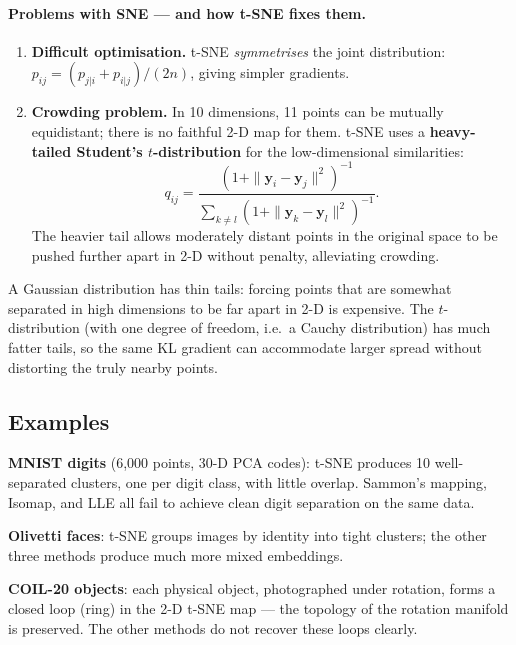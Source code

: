 \documentclass[11pt, oneside]{book}
\begin{document}
\paragraph{Problems with SNE — and how t-SNE fixes them.}
\begin{enumerate}
  \item \textbf{Difficult optimisation.}
        t-SNE \emph{symmetrises} the joint distribution:
        $p_{ij}=(p_{j|i}+p_{i|j})/(2n)$, giving simpler gradients.
  \item \textbf{Crowding problem.}
        In 10 dimensions, 11 points can be mutually equidistant; there is
        no faithful 2-D map for them.
        t-SNE uses a \textbf{heavy-tailed Student's $t$-distribution} for the
        low-dimensional similarities:
        \[
          q_{ij} = \frac{(1+\|\bm{y}_i-\bm{y}_j\|^2)^{-1}}
                        {\sum_{k\neq l}(1+\|\bm{y}_k-\bm{y}_l\|^2)^{-1}}.
        \]
        The heavier tail allows moderately distant points in the original space
        to be pushed further apart in 2-D without penalty, alleviating crowding.
\end{enumerate}

\begin{intbox}[title={Why the $t$-distribution helps}]
A Gaussian distribution has thin tails: forcing points that are somewhat
separated in high dimensions to be far apart in 2-D is expensive.
The $t$-distribution (with one degree of freedom, i.e.\ a Cauchy distribution)
has much fatter tails, so the same KL gradient can accommodate larger
spread without distorting the truly nearby points.
\end{intbox}

\subsection{Examples}

\textbf{MNIST digits} (6{,}000 points, 30-D PCA codes): t-SNE produces 10
well-separated clusters, one per digit class, with little overlap.
Sammon's mapping, Isomap, and LLE all fail to achieve clean digit separation
on the same data.

\textbf{Olivetti faces}: t-SNE groups images by identity into tight clusters;
the other three methods produce much more mixed embeddings.

\textbf{COIL-20 objects}: each physical object, photographed under rotation,
forms a closed loop (ring) in the 2-D t-SNE map — the topology of the
rotation manifold is preserved.
The other methods do not recover these loops clearly.
\end{document}
